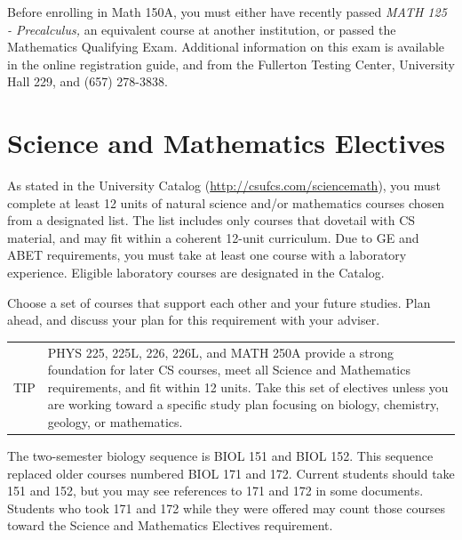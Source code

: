 \documentclass{book}
\newenvironment{tip}{
  \tcolorbox \begin{tabular}{m{.5in} m{5.25in}}
    \Large{TIP} &
}{
  \end{tabular} \endtcolorbox
}
\newcommand{\shrunkurl}[1]{\url{http://csufcs.com/#1}}
\begin{document}
Before enrolling in Math 150A, you must either have recently passed \emph{MATH 125 - Precalculus,} an equivalent course at another institution, or passed the Mathematics Qualifying Exam. Additional information on this exam is available in the online registration guide, and from the Fullerton Testing Center, University Hall 229, and (657) 278-3838.

\section{Science and Mathematics Electives}

As stated in the University Catalog (\shrunkurl{sciencemath}), you must complete at least 12 units of natural science and/or mathematics courses chosen from a designated list. The list includes only courses that dovetail with CS material, and may fit within a coherent 12-unit curriculum. Due to GE and ABET requirements, you must take at least one course with a laboratory experience. Eligible laboratory courses are designated in the Catalog.

Choose a set of courses that support each other and your future studies. Plan ahead, and discuss your plan for this requirement with your adviser.

\begin{tip}
PHYS 225, 225L, 226, 226L, and MATH 250A provide a strong foundation for later CS courses, meet all Science and Mathematics requirements, and fit within 12 units. Take this set of electives unless you are working toward a specific study plan focusing on biology, chemistry, geology, or mathematics.
\end{tip}



The two-semester biology sequence is BIOL 151 and BIOL 152. This sequence replaced older courses numbered BIOL 171 and 172. Current students should take 151 and 152, but you may see references to 171 and 172 in some documents. Students who took 171 and 172 while they were offered may count those courses toward the Science and Mathematics Electives requirement.
\end{document}

